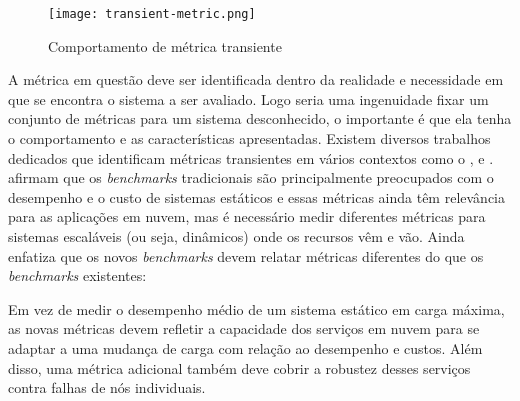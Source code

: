 \begin{figure}[!htb]
	\centering
	\texttt{[image: transient-metric.png]}
	\caption{Comportamento de métrica transiente}
	\label{fig:transient-metric}
\end{figure}


A métrica em questão deve ser identificada dentro da realidade e necessidade em que se encontra o sistema a ser avaliado. Logo seria uma ingenuidade fixar um conjunto de métricas para um sistema desconhecido, o importante é que ela tenha o comportamento e as características apresentadas. Existem diversos trabalhos dedicados que identificam métricas transientes em vários contextos como o ,  e .
 afirmam que os \textit{benchmarks} tradicionais são principalmente preocupados com o desempenho e o custo de sistemas estáticos e essas métricas ainda têm relevância para as aplicações em nuvem, mas é necessário medir diferentes métricas para sistemas escaláveis (ou seja, dinâmicos) onde os recursos vêm e vão. Ainda  enfatiza que os novos \textit{benchmarks} devem relatar métricas diferentes do que os \textit{benchmarks} existentes: 
\begin{citacao}
	Em vez de medir o desempenho médio de um sistema estático em carga máxima, as novas métricas devem refletir a capacidade dos serviços em nuvem para se adaptar a uma mudança de carga com relação ao desempenho e custos. Além disso, uma métrica adicional também deve cobrir a robustez desses serviços contra falhas de nós individuais.
\end{citacao}

